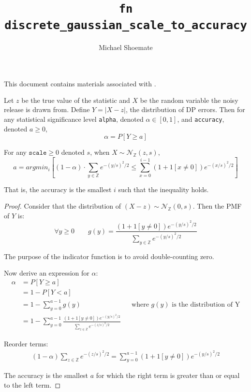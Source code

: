 \documentclass{article}
\title{\texttt{fn discrete\_gaussian\_scale\_to\_accuracy}}
\author{Michael Shoemate}
\begin{document}
\maketitle

This document contains materials associated with .

\begin{definition}
    Let $z$ be the true value of the statistic and $X$ be the random variable the noisy release is drawn from.
    Define $Y = |X - z|$, the distribution of DP errors. 
    Then for any statistical significance level \texttt{alpha}, denoted $\alpha \in [0, 1]$, and \texttt{accuracy}, denoted $a \ge 0$,
    \begin{equation}
        \alpha = P[Y \ge a]
    \end{equation}
\end{definition}

\begin{theorem}
    For any $\texttt{scale} \ge 0$ denoted $s$, when $X \sim \mathcal{N}_\mathbb{Z}(z, s)$, 
    \begin{equation}
        a = argmin_i \left[(1 - \alpha) \cdot \sum_{y\in \mathbb{Z}} e^{-(y/s)^2/2} 
        \le \sum_{x=0}^{i - 1} (1 + 1[x \ne 0]) e^{-(x/s)^2/2} \right]
    \end{equation}

    That is, the accuracy is the smallest $i$ such that the inequality holds.
\end{theorem}

\begin{proof}

Consider that the distribution of $(X - z) \sim \mathcal{N}_\mathbb{Z}(0, s)$.
Then the PMF of $Y$ is:
\begin{equation}
    \forall y \ge 0 \qquad g(y) = \frac{(1 + 1[y \ne 0]) e^{-(y/s)^2/2}}{\sum_{y \in \mathbb{Z}} e^{-(y/s)^2/2} }
\end{equation}

The purpose of the indicator function is to avoid double-counting zero.

Now derive an expression for $\alpha$:
\begin{align*}
    \alpha &= P[Y \ge a] \\
    &= 1 - P[Y < a] \\
    &= 1 - \sum_{y=0}^{a - 1} g(y) && \text{where $g(y)$ is the distribution of Y} \\
    &= 1 - \sum_{y=0}^{a - 1} \frac{(1 + 1[y \ne 0]) e^{-(y/s)^2/2}}{\sum_{z \in \mathbb{Z}} e^{-(z/s)^2/2} }
\end{align*}

Reorder terms:
\begin{align*}
    (1 - \alpha) \sum_{z \in \mathbb{Z}} e^{-(z/s)^2/2} = \sum_{y=0}^{a - 1} (1 + 1[y \ne 0]) e^{-(y/s)^2/2}
\end{align*}

The accuracy is the smallest $a$ for which the right term is greater than or equal to the left term.
\end{proof}
\end{document}
